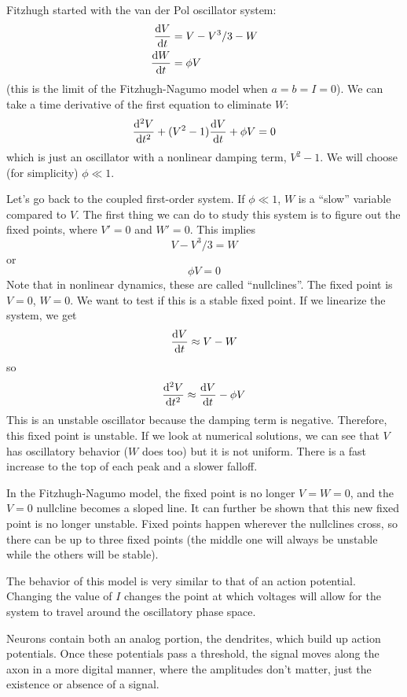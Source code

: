 \documentclass[a4paper,twoside,master.tex]{subfiles}
\begin{document}
Fitzhugh started with the van der Pol oscillator system:
\begin{align}
    \dv{V}{t} &= V - V^3 / 3 - W \\
    \dv{W}{t} &= \phi V
\end{align}
(this is the limit of the Fitzhugh-Nagumo model when $ a = b = I = 0 $). We can take a time derivative of the first equation to eliminate $ W $:
\begin{equation}
    \dv[2]{V}{t} + (V^2 - 1) \dv{V}{t} + \phi V = 0
\end{equation}
which is just an oscillator with a nonlinear damping term, $ V^2 - 1 $. We will choose (for simplicity) $ \phi \ll 1 $.

Let's go back to the coupled first-order system. If $ \phi \ll 1 $, $ W $ is a ``slow'' variable compared to $ V $. The first thing we can do to study this system is to figure out the fixed points, where $ V' = 0 $ and $ W' = 0 $. This implies
\begin{equation}
    V - V^3 / 3 = W
\end{equation}
or
\begin{equation}
    \phi V = 0
\end{equation}
Note that in nonlinear dynamics, these are called ``nullclines''. The fixed point is $ V = 0 $, $ W = 0 $. We want to test if this is a stable fixed point. If we linearize the system, we get
\begin{equation}
    \dv{V}{t} \approx V - W
\end{equation}
so
\begin{equation}
    \dv[2]{V}{t} \approx \dv{V}{t} - \phi V
\end{equation}
This is an unstable oscillator because the damping term is negative. Therefore, this fixed point is unstable. If we look at numerical solutions, we can see that $ V $ has oscillatory behavior ($ W $ does too) but it is not uniform. There is a fast increase to the top of each peak and a slower falloff.

In the Fitzhugh-Nagumo model, the fixed point is no longer $ V = W = 0 $, and the $ V = 0 $ nullcline becomes a sloped line. It can further be shown that this new fixed point is no longer unstable. Fixed points happen wherever the nullclines cross, so there can be up to three fixed points (the middle one will always be unstable while the others will be stable).

The behavior of this model is very similar to that of an action potential. Changing the value of $ I $ changes the point at which voltages will allow for the system to travel around the oscillatory phase space.

Neurons contain both an analog portion, the dendrites, which build up action potentials. Once these potentials pass a threshold, the signal moves along the axon in a more digital manner, where the amplitudes don't matter, just the existence or absence of a signal.
\end{document}
